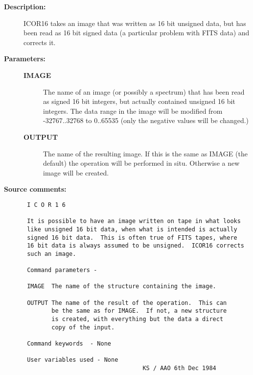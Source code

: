 \begin{description}

\item [{\bf Description:}]
 ICOR16 takes an image that was written as 16 bit unsigned data, but
 has been read as 16 bit signed data (a particular problem with FITS
 data) and corrects it.

\item [{\bf Parameters:}]
\begin{description}
\item [{\bf IMAGE}]
 The name of an image (or possibly a spectrum) that
 has been read as signed 16 bit integers, but actually
 contained unsigned 16 bit integers.  The data range
 in the image will be modified from -32767..32768 to
 0..65535 (only the negative values will be changed.)
\item [{\bf OUTPUT}]
 The name of the resulting image.  If this is
 the same as IMAGE (the default) the operation
 will be performed in situ.  Otherwise a new
 image will be created.
\end{description}

\item [{\bf Source comments:}]
\begin{verbatim}
 I C O R 1 6

 It is possible to have an image written on tape in what looks
 like unsigned 16 bit data, when what is intended is actually
 signed 16 bit data.  This is often true of FITS tapes, where
 16 bit data is always assumed to be unsigned.  ICOR16 corrects
 such an image.

 Command parameters -

 IMAGE  The name of the structure containing the image.

 OUTPUT The name of the result of the operation.  This can
        be the same as for IMAGE.  If not, a new structure
        is created, with everything but the data a direct
        copy of the input.

 Command keywords  - None

 User variables used - None
                                  KS / AAO 6th Dec 1984
\end{verbatim}
\end{description}
